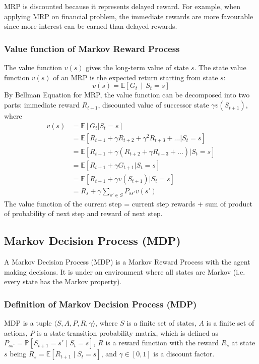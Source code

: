 \documentclass{article} %
\begin{document}
MRP is discounted because it represents delayed reward. For example, when applying MRP on financial problem, the immediate rewards are more favourable since more interest can be earned than delayed rewards. 

\subsubsection{Value function of Markov Reward Process}
The value function \( v(s) \) gives the long-term value of state \( s \). The state value function \( v(s) \) of an MRP is the expected return starting from state \( s \):
\[
v(s) = \mathbb{E} \left[ G_t \, \middle| \, S_t = s \right]
\]
By Bellman Equation for MRP, the value function can be decomposed into two parts: immediate reward \( R_{t+1} \), discounted value of successor state \(\gamma v(S_{t+1})\), where
\begin{align*}
v(s) &= \mathbb{E}[G_t | S_t = s] \\
&= \mathbb{E}[R_{t+1} + \gamma R_{t+2} + \gamma^2 R_{t+3} + \ldots | S_t = s] \\
&= \mathbb{E}[R_{t+1} + \gamma (R_{t+2} + \gamma R_{t+3} + \ldots) | S_t = s] \\
&= \mathbb{E}[R_{t+1} + \gamma G_{t+1} | S_t = s] \\
&= \mathbb{E}[R_{t+1} + \gamma v(S_{t+1}) | S_t = s]\\
&= R_s + \gamma \sum_{s' \in S} P_{ss'} v(s')
\end{align*}
The value function of the current step = current step rewards + sum of product of probability of next step and reward of next step.

\subsection{Markov Decision Process (MDP)}
A Markov Decision Process (MDP) is a Markov Reward Process with the agent making decisions. It is under an environment where all states are Markov (i.e. every state has the Markov property).

\subsubsection{Definition of Markov Decision Process (MDP)}
MDP is a tuple \(\langle S, A, P, R, \gamma \rangle\), where
\(S\) is a finite set of states, \(A\) is a finite set of actions, \(P\) is a state transition probability matrix, which is defined as $P_{ss'} = \mathbb{P}[S_{t+1} = s' \mid S_t = s]$, 
      \(R\) is a reward function with the reward $R_s$ at state $s$ being $    R_s = \mathbb{E}[R_{t+1} \mid S_t = s]$, and    
   \(\gamma\in [0, 1]\) is a discount factor. 
\end{document}
